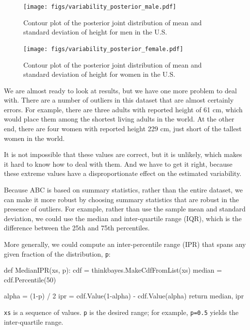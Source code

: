 \documentclass[12pt]{book}
\theoremstyle{exercise}
\begin{document}
\begin{figure}
\centerline{\texttt{[image: figs/variability\_posterior\_male.pdf]}}
\caption{Contour plot of the posterior joint distribution of
mean and standard deviation of height for men in the U.S.}
\label{fig.variability1}
\end{figure}

\begin{figure}
\centerline{\texttt{[image: figs/variability\_posterior\_female.pdf]}}
\caption{Contour plot of the posterior joint distribution of
mean and standard deviation of height for women in the U.S.}
\label{fig.variability2}
\end{figure}

We are almost ready to look at results, but we have one more
problem to deal with.  There are a number of outliers in this
dataset that are almost certainly errors.  For example, there
are three adults with reported height of 61 cm, which would
place them among the shortest living adults in the world.
At the other end, there are four women with reported height
229 cm, just short of the tallest women in the world.

It is not impossible that these values are correct, but it is
unlikely, which makes it hard to know how to deal with them.
And we have to get
it right, because these extreme values have a disproportionate
effect on the estimated variability.

Because ABC is based on summary statistics, rather than the entire
dataset, we can make it more robust by choosing summary statistics
that are robust in the presence of outliers.  For example, rather
than use the sample mean and standard deviation, we could use the median
and inter-quartile range
(IQR), which is the difference between the 25th and 75th percentiles.

More generally, we could compute an inter-percentile range (IPR) that
spans any given fraction of the distribution, {\tt p}:

\begin{code}
def MedianIPR(xs, p):
    cdf = thinkbayes.MakeCdfFromList(xs)
    median = cdf.Percentile(50)

    alpha = (1-p) / 2
    ipr = cdf.Value(1-alpha) - cdf.Value(alpha)
    return median, ipr
\end{code}

{\tt xs} is a sequence of values.  {\tt p} is the desired range;
for example, {\tt p=0.5} yields the inter-quartile range.
\end{document}
